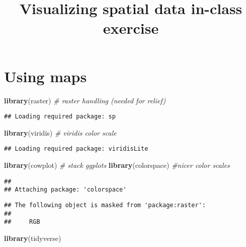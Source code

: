 \documentclass[
]{article}
\title{Visualizing spatial data in-class exercise}
\author{}
\date{\vspace{-2.5em}}
\newenvironment{Shaded}{\begin{snugshade}}{\end{snugshade}}
\newcommand{\CommentTok}[1]{\textcolor[rgb]{0.56,0.35,0.01}{\textit{#1}}}
\newcommand{\FunctionTok}[1]{\textcolor[rgb]{0.13,0.29,0.53}{\textbf{#1}}}
\newcommand{\NormalTok}[1]{#1}
\begin{document}
\maketitle

\hypertarget{using-maps}{%
\section{Using maps}\label{using-maps}}

\begin{Shaded}
\begin{Highlighting}[]
\FunctionTok{library}\NormalTok{(raster) }\CommentTok{\# raster handling (needed for relief)}
\end{Highlighting}
\end{Shaded}

\begin{verbatim}
## Loading required package: sp
\end{verbatim}

\begin{Shaded}
\begin{Highlighting}[]
\FunctionTok{library}\NormalTok{(viridis) }\CommentTok{\# viridis color scale}
\end{Highlighting}
\end{Shaded}

\begin{verbatim}
## Loading required package: viridisLite
\end{verbatim}

\begin{Shaded}
\begin{Highlighting}[]
\FunctionTok{library}\NormalTok{(cowplot) }\CommentTok{\# stack ggplots}
\FunctionTok{library}\NormalTok{(colorspace) }\CommentTok{\#nicer color scales}
\end{Highlighting}
\end{Shaded}

\begin{verbatim}
## 
## Attaching package: 'colorspace'
\end{verbatim}

\begin{verbatim}
## The following object is masked from 'package:raster':
## 
##     RGB
\end{verbatim}

\begin{Shaded}
\begin{Highlighting}[]
\FunctionTok{library}\NormalTok{(tidyverse)}
\end{Highlighting}
\end{Shaded}
\end{document}
